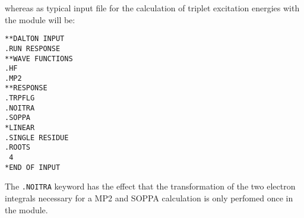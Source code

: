 whereas as typical input file for the calculation of triplet
excitation energies with the
 module will be: 
\begin{verbatim}
**DALTON INPUT
.RUN RESPONSE
**WAVE FUNCTIONS
.HF
.MP2
**RESPONSE
.TRPFLG
.NOITRA
.SOPPA
*LINEAR
.SINGLE RESIDUE
.ROOTS
 4
*END OF INPUT
\end{verbatim}
The {\tt .NOITRA} keyword has the effect that the transformation of the two 
electron integrals necessary for a MP2 and SOPPA calculation is only perfomed
once in the  module.



